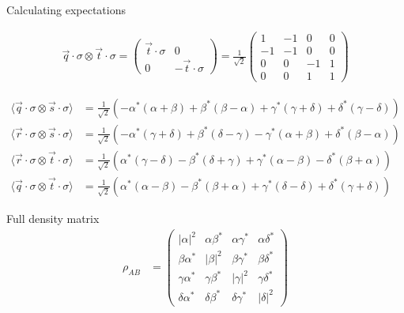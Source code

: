 \documentclass[aspectratio=1610]{beamer}					%
\begin{document}
\begin{frame}{Calculating expectations}


\begin{align*}
\vec{q}\cdot\sigma\otimes\vec{t}\cdot\sigma = 
\begin{pmatrix}
\vec{t}\cdot\sigma & 0\\
0 & -\vec{t}\cdot\sigma
\end{pmatrix} = 
\frac{1}{\sqrt{2}}\begin{pmatrix}
1 & -1 & 0 & 0\\
-1 & -1 & 0 & 0\\
0 & 0 & -1 & 1 \\
0 & 0 & 1 & 1
\end{pmatrix}
\end{align*}


\begin{align*}
\langle \vec{q}\cdot\sigma\otimes\vec{s}\cdot\sigma\rangle &= \frac{1}{\sqrt{2}}\left(-\alpha^{*}(\alpha+\beta) + \beta^{*}(\beta-\alpha) + \gamma^{*}(\gamma+\delta) + \delta^{*}(\gamma-\delta)\right)\\
\langle \vec{r}\cdot\sigma\otimes\vec{s}\cdot\sigma\rangle &= \frac{1}{\sqrt{2}}\left(-\alpha^{*}(\gamma+\delta) + \beta^{*}(\delta-\gamma) - \gamma^{*}(\alpha + \beta) + \delta^{*}(\beta-\alpha)\right)\\
\langle \vec{r}\cdot\sigma\otimes\vec{t}\cdot\sigma\rangle &= \frac{1}{\sqrt{2}}\left(\alpha^{*}(\gamma-\delta) - \beta^{*}(\delta+\gamma) + \gamma^{*}(\alpha - \beta) - \delta^{*}(\beta+\alpha)\right)\\
\langle \vec{q}\cdot\sigma\otimes\vec{t}\cdot\sigma\rangle &= \frac{1}{\sqrt{2}}\left(\alpha^{*}(\alpha-\beta) - \beta^{*}(\beta+\alpha) + \gamma^{*}(\delta-\delta) + \delta^{*}(\gamma+\delta)\right)
\end{align*}


\end{frame}

\begin{frame}{Full density matrix}
\begin{align*}
\rho_{AB} &=\begin{pmatrix}
|\alpha|^{2} & \alpha\beta^{*} & \alpha\gamma^{*} & \alpha\delta^{*} \\
\beta\alpha^{*} & |\beta|^{2} & \beta\gamma^{*} & \beta\delta^{*} \\
\gamma\alpha^{*} & \gamma\beta^{*} & |\gamma|^{2} & \gamma\delta^{*} \\
\delta\alpha^{*} & \delta\beta^{*} & \delta\gamma^{*} & |\delta|^{2}
\end{pmatrix}
\end{align*}
\end{frame}
\end{document}
